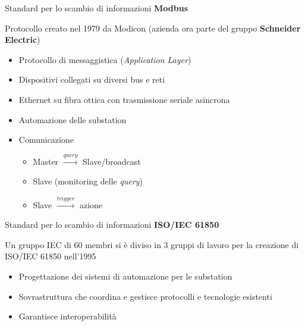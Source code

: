 \begin{frame}{Standard per lo scambio di informazioni}
	\textbf{Modbus}
	\begin{block}{}
	Protocollo creato nel 1979 da Modicon (azienda ora parte del gruppo \textbf{\color{blue_slides}Schneider Electric})
	\end{block}
	\pause
	\begin{itemize}[<+- | alert@+>]
		\item Protocollo di messaggistica (\textit{Application Layer})%
		\item Dispositivi collegati su diversi bus e reti%
		\item Ethernet su fibra ottica con trasmissione seriale asincrona%
		\item Automazione delle substation%
		\item Comunicazione
			\begin{itemize}[<+- | alert@+>]
			\item Master $\xrightarrow{query}$ Slave/broadcast
			\item Slave (monitoring delle \textit{query})
			\item Slave $\xrightarrow{trigger}$ azione
			\end{itemize}
	\end{itemize}
\end{frame}


\begin{frame}{Standard per lo scambio di informazioni}
	\textbf{ISO/IEC 61850}
	\begin{block}{}
		Un gruppo IEC di 60 membri si è diviso in 3 gruppi di lavoro per la creazione di ISO/IEC 61850 nell'1995
	\end{block}
	\pause
	\begin{itemize}[<+- | alert@+>]
		\item Progettazione dei sistemi di automazione per le substation
		\item Sovrastruttura che coordina e gestisce protocolli e tecnologie esistenti
		\item Garantisce interoperabilità
	\end{itemize}
\end{frame}


